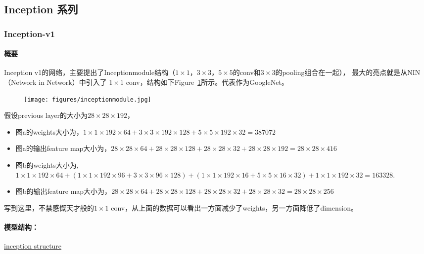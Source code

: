 \documentclass{article}
\begin{document}
\begin{CJK}{UTF8}{gbsn}
\subsection{Inception 系列}
\subsubsection{Inception-v1}
\paragraph{概要}
Inception v1的网络，主要提出了Inceptionmodule结构（$1 \times 1$，$3 \times 3$，$5 \times 5$的conv和$3 \times 3$的pooling组合在一起），
最大的亮点就是从NIN（Network in Network）中引入了 $1 \times 1$ conv，结构如下Figure~\ref{fig:inceptionmodule}所示。代表作为GoogleNet。

\begin{figure}[!h]
    \centering
    \texttt{[image: figures/inceptionmodule.jpg]}
    \caption{}
    \label{fig:inceptionmodule}
\end{figure}

假设previous layer的大小为$28 \times 28 \times 192$，
\begin{itemize}
    \item 图a的weights大小为，$1 \times 1 \times 192 \times 64 + 3 \times 3 \times 192 \times 128 + 5 \times 5 \times 192 \times 32=387072$
    \item 图a的输出feature map大小为，$28 \times 28 \times 64 + 28 \times 28 \times 128 + 28 \times 28 \times 32 + 28 \times 28 \times 192 = 28 \times 28 \times 416$
    \item 图b的weights大小为, $1 \times 1 \times 192 \times 64 + 
        (1 \times 1 \times 192 \times 96 + 3 \times 3 \times 96 \times 128) + 
        (1 \times 1 \times 192 \times 16 + 5 \times 5 \times 16 \times 32) + 1 \times 1 \times 192 \times 32=163328$.
    \item 图b的输出feature map大小为，$28 \times 28 \times 64 + 28 \times 28 \times 128 + 28 \times 28 \times 32 + 28 \times 28 \times 32 = 28 \times 28 \times 256$
\end{itemize}
写到这里，不禁感慨天才般的$1 \times 1$ conv，从上面的数据可以看出一方面减少了weights，另一方面降低了dimension。


\paragraph{模型结构：}
    \href{https://img-blog.csdn.net/20160904161917654}{inception structure}



\end{CJK}
\end{document}
